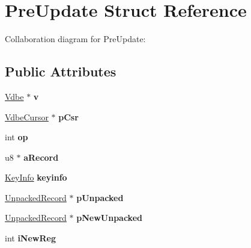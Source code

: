 \hypertarget{structPreUpdate}{}\section{Pre\+Update Struct Reference}
\label{structPreUpdate}


Collaboration diagram for Pre\+Update\+:
\subsection*{Public Attributes}
\begin{DoxyCompactItemize}
\item 
\hyperlink{structVdbe}{Vdbe} $\ast$ {\bfseries v}\hypertarget{structPreUpdate_a6fccc7c418de1a789595f9814a4f5f81}{}\label{structPreUpdate_a6fccc7c418de1a789595f9814a4f5f81}

\item 
\hyperlink{structVdbeCursor}{Vdbe\+Cursor} $\ast$ {\bfseries p\+Csr}\hypertarget{structPreUpdate_a4716275b8f780b4f63f1a379a846c620}{}\label{structPreUpdate_a4716275b8f780b4f63f1a379a846c620}

\item 
int {\bfseries op}\hypertarget{structPreUpdate_aaecf3af9f7b62a4fd140d0d1300201cf}{}\label{structPreUpdate_aaecf3af9f7b62a4fd140d0d1300201cf}

\item 
u8 $\ast$ {\bfseries a\+Record}\hypertarget{structPreUpdate_a148cb72a74c7943828e02a5ce88ef662}{}\label{structPreUpdate_a148cb72a74c7943828e02a5ce88ef662}

\item 
\hyperlink{structKeyInfo}{Key\+Info} {\bfseries keyinfo}\hypertarget{structPreUpdate_a8bb920205df3c43820a81dcd3c1cf5bb}{}\label{structPreUpdate_a8bb920205df3c43820a81dcd3c1cf5bb}

\item 
\hyperlink{structUnpackedRecord}{Unpacked\+Record} $\ast$ {\bfseries p\+Unpacked}\hypertarget{structPreUpdate_ab43a1f36e6ab8c9aa8b1e52f1d80d07f}{}\label{structPreUpdate_ab43a1f36e6ab8c9aa8b1e52f1d80d07f}

\item 
\hyperlink{structUnpackedRecord}{Unpacked\+Record} $\ast$ {\bfseries p\+New\+Unpacked}\hypertarget{structPreUpdate_a70c572bb14af1dfdff8a1d6619548de0}{}\label{structPreUpdate_a70c572bb14af1dfdff8a1d6619548de0}

\item 
int {\bfseries i\+New\+Reg}\hypertarget{structPreUpdate_aadbf462d0c2b3d64387f9ece92ad2ed1}{}\label{structPreUpdate_aadbf462d0c2b3d64387f9ece92ad2ed1}


\end{DoxyCompactItemize}
